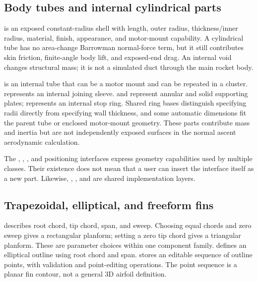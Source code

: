 \subsection{Body tubes and internal cylindrical parts}
 is an exposed constant-radius shell with length, outer radius, thickness/inner radius, material, finish, appearance, and motor-mount capability. A cylindrical tube has no area-change Barrowman normal-force term, but it still contributes skin friction, finite-angle body lift, and exposed-end drag. An internal void changes structural mass; it is not a simulated duct through the main rocket body.

 is an internal tube that can be a motor mount and can be repeated in a cluster.  represents an internal joining sleeve.  and  represent annular and solid supporting plates;  represents an internal stop ring. Shared ring bases distinguish specifying radii directly from specifying wall thickness, and some automatic dimensions fit the parent tube or enclosed motor-mount geometry. These parts contribute mass and inertia but are not independently exposed surfaces in the normal ascent aerodynamic calculation.

The , , , and positioning interfaces express geometry capabilities used by multiple classes. Their existence does not mean that a user can insert the interface itself as a new part. Likewise, , , and  are shared implementation layers.


\subsection{Trapezoidal, elliptical, and freeform fins}
 describes root chord, tip chord, span, and sweep. Choosing equal chords and zero sweep gives a rectangular planform; setting a zero tip chord gives a triangular planform. These are parameter choices within one component family.  defines an elliptical outline using root chord and span.  stores an editable sequence of outline points, with validation and point-editing operations. The point sequence is a planar fin contour, not a general 3D airfoil definition.

